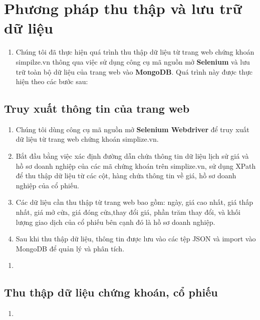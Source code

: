 \section{Phương pháp thu thập và lưu trữ dữ liệu}
\begin{enumerate}
    \item []\hspace*{0.7cm} Chúng tôi đã thực hiện quá trình thu thập dữ liệu từ trang web chứng khoán simpilze.vn thông qua việc sử dụng công cụ mã nguồn mở \textbf{Selenium} và lưu trữ toàn bộ dữ liệu của trang web vào \textbf{MongoDB}. Quá trình này được thực hiện theo các bước sau:
\end{enumerate}
\subsection{Truy xuất thông tin của trang web}
\begin{enumerate}
    \item[] \hspace*{0.7cm}Chúng tôi dùng công cụ mã nguồn mở \textbf{Selenium Webdriver} để truy xuất dữ liệu từ trang web chứng khoán simplize.vn.
    
    \item[] \hspace*{0.7cm}Bắt đầu bằng việc xác định đường dẫn chứa thông tin dữ liệu lịch sử giá và hồ sơ doanh nghiệp của các mã chứng khoán trên simplize.vn, sử dụng XPath để thu thập dữ liệu từ các cột, hàng chứa thông tin về giá, hồ sơ doanh nghiệp của cổ phiếu.

    \item[]\hspace*{0.7cm}Các dữ liệu cần thu thập từ trang web bao gồm: ngày, giá cao nhất, giá thấp nhất, giá mở cửa, giá đóng cửa,thay đổi giá, phần trăm thay đổi, và khối lượng giao dịch của cổ phiếu bên cạnh đó là hồ sơ doanh nghiệp.

    \item[]\hspace*{0.7cm}Sau khi thu thập dữ liệu, thông tin được lưu vào các tệp JSON và import vào MongoDB để quản lý và phân tích.
\end{enumerate}
\newpage
\begin{enumerate}
    \item []
\end{enumerate}
\subsection{Thu thập dữ liệu chứng khoán, cổ phiếu}
\begin{enumerate}
    \item []
\end{enumerate}

